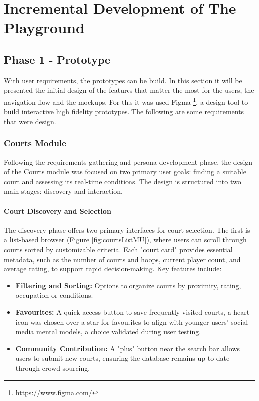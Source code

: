 \chapter{Incremental Development of The Playground}

\section{Phase 1 - Prototype}
\label{sec:rp-prototype}

With user requirements, the prototypes can be build.
In this section it will be presented the initial design of the features that matter the most for the users, the navigation flow and the mockups.
For this it was used Figma \footnote{https://www.figma.com/}, a design tool to build interactive high fidelity prototypes.
The following are some requirements that were design.


\subsection{Courts Module}
\label{subsec:rp-courts}
Following the requirements gathering and persona development phase, the design of the Courts module was focused on two primary user goals: finding a suitable court and assessing its real-time conditions. The design is structured into two main stages: discovery and interaction.

\subsubsection{Court Discovery and Selection}

The discovery phase offers two primary interfaces for court selection. The first is a list-based browser (Figure \ref{fig:courtsListMU}), where users can scroll through courts sorted by customizable criteria. Each "court card" provides essential metadata, such as the number of courts and hoops, current player count, and average rating, to support rapid decision-making.
Key features include:

\begin{itemize}
	
	\item \textbf{Filtering and Sorting:} Options to organize courts by proximity, rating, occupation or conditions.
	\item \textbf{Favourites:} A quick-access button to save frequently visited courts, a heart icon was chosen over a star for favourites to align with younger users' social media mental models, a choice validated during user testing.
	\item \textbf{Community Contribution:} A "plus" button near the search bar allows users to submit new courts, ensuring the database remains up-to-date through crowd sourcing.
	
\end{itemize}


